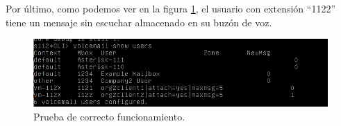\documentclass[a4paper]{article}
\begin{document}
 
Por último, como podemos ver en la figura \ref{fig:prueba}, el usuario con extensión ``1122'' tiene un mensaje sin escuchar almacenado en su buzón de voz.

\begin{figure}
    \begin{center}
        \includegraphics[width=1.1\textwidth]{buzonvoz.jpg}
         \caption{Prueba de correcto funcionamiento.}
         \label{fig:prueba}
    \end{center}
\end{figure}

\newpage
\end{document}

